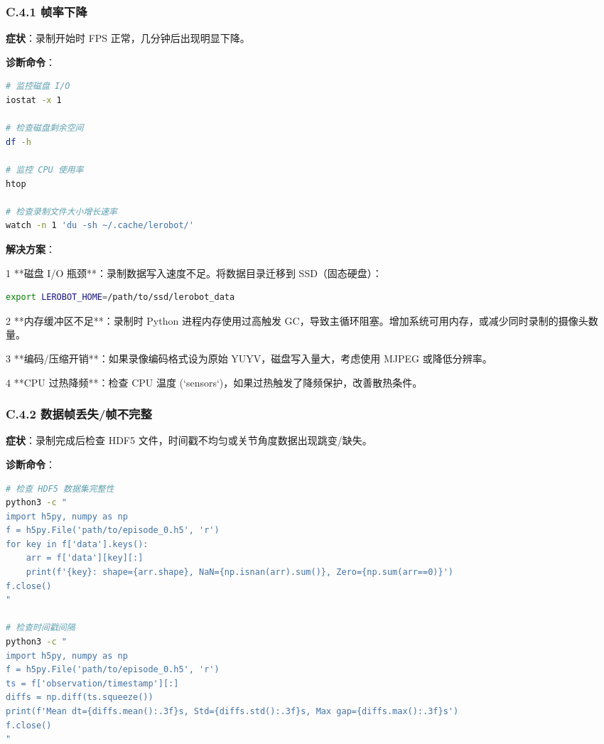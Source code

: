 \documentclass[UTF8,a4paper,11pt]{ctexart}
\begin{document}
{\subsubsection{C.4.1 帧率下降}

\textbf{症状}：录制开始时 FPS 正常，几分钟后出现明显下降。

\textbf{诊断命令}：
\begin{lstlisting}[language=bash]
# 监控磁盘 I/O
iostat -x 1

# 检查磁盘剩余空间
df -h

# 监控 CPU 使用率
htop

# 检查录制文件大小增长速率
watch -n 1 'du -sh ~/.cache/lerobot/'
\end{lstlisting}

\textbf{解决方案}：
\item[1] **磁盘 I/O 瓶颈**：录制数据写入速度不足。将数据目录迁移到 SSD（固态硬盘）：
\begin{lstlisting}[language=bash]
   export LEROBOT_HOME=/path/to/ssd/lerobot_data
\end{lstlisting}
\item[2] **内存缓冲区不足**：录制时 Python 进程内存使用过高触发 GC，导致主循环阻塞。增加系统可用内存，或减少同时录制的摄像头数量。
\item[3] **编码/压缩开销**：如果录像编码格式设为原始 YUYV，磁盘写入量大，考虑使用 MJPEG 或降低分辨率。
\item[4] **CPU 过热降频**：检查 CPU 温度 (`sensors`)，如果过热触发了降频保护，改善散热条件。

\subsubsection{C.4.2 数据帧丢失/帧不完整}

\textbf{症状}：录制完成后检查 HDF5 文件，时间戳不均匀或关节角度数据出现跳变/缺失。

\textbf{诊断命令}：
\begin{lstlisting}[language=bash]
# 检查 HDF5 数据集完整性
python3 -c "
import h5py, numpy as np
f = h5py.File('path/to/episode_0.h5', 'r')
for key in f['data'].keys():
    arr = f['data'][key][:]
    print(f'{key}: shape={arr.shape}, NaN={np.isnan(arr).sum()}, Zero={np.sum(arr==0)}')
f.close()
"

# 检查时间戳间隔
python3 -c "
import h5py, numpy as np
f = h5py.File('path/to/episode_0.h5', 'r')
ts = f['observation/timestamp'][:]
diffs = np.diff(ts.squeeze())
print(f'Mean dt={diffs.mean():.3f}s, Std={diffs.std():.3f}s, Max gap={diffs.max():.3f}s')
f.close()
"
\end{lstlisting}

}
\end{document}
